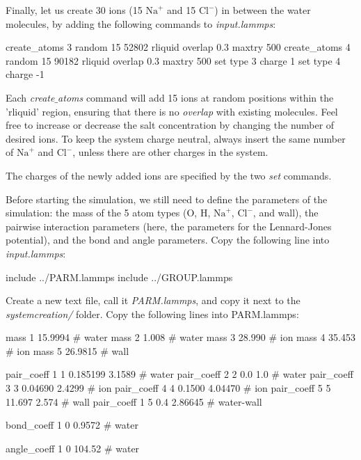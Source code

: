 \vspace{0.25cm} \noindent Finally, let us create 30 ions (15 $\text{Na}^+$
and 15 $\text{Cl}^-$)
in between the water molecules, by adding the following commands to \textit{input.lammps}:

\begin{lcverbatim}
create_atoms 3 random 15 52802 rliquid overlap 0.3 maxtry 500
create_atoms 4 random 15 90182 rliquid overlap 0.3 maxtry 500
set type 3 charge 1
set type 4 charge -1
\end{lcverbatim}

\noindent Each \textit{create$\_$atoms} command will add 15 ions at random positions
within the 'rliquid' region, ensuring that there is no \textit{overlap} with existing
molecules. Feel free to increase or decrease the salt
concentration by changing the number of desired ions. To keep the system charge neutral,
always insert the same number of 
$\text{Na}^+$
and $\text{Cl}^-$,
unless there are other charges in the system.

\vspace{0.25cm} \noindent The charges of the newly added ions are specified by the two \textit{set} commands.

\vspace{0.25cm} \noindent Before starting the simulation, we still need to define the parameters of the simulation: the mass
of the 5 atom types (O, H, $\text{Na}^+$, $\text{Cl}^-$, and wall), the
pairwise interaction parameters (here, the parameters for the
Lennard-Jones potential), and the bond and angle parameters.
Copy the following line into \textit{input.lammps}:

\begin{lcverbatim}
include ../PARM.lammps
include ../GROUP.lammps
\end{lcverbatim}

\noindent Create a new text file, call it \textit{PARM.lammps}, and copy it
next to the \textit{systemcreation/} folder. Copy the following lines
into PARM.lammps:

\begin{lcverbatim}
mass 1 15.9994 # water
mass 2 1.008 # water
mass 3 28.990 # ion
mass 4 35.453 # ion
mass 5 26.9815 # wall

pair_coeff 1 1 0.185199 3.1589 # water
pair_coeff 2 2 0.0 1.0 # water
pair_coeff 3 3 0.04690 2.4299 # ion
pair_coeff 4 4 0.1500 4.04470 # ion
pair_coeff 5 5 11.697 2.574 # wall
pair_coeff 1 5 0.4 2.86645 # water-wall

bond_coeff 1 0 0.9572 # water

angle_coeff 1 0 104.52 # water
\end{lcverbatim}


